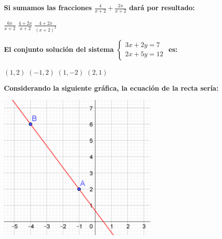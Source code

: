 \documentclass[11pt, addpoints, answers]{exam}
\begin{document}
\begin{questions}
		\question[1] \textbf{Si sumamos las fracciones $\frac{4}{x+2} + \frac{2x}{x+2}$ dará por resultado:}
		
		  
		
		\begin{choices} %
			\choice $\frac{6x}{x+2}$
			\choice $\frac{4+2x}{x+2}$
			\choice $\frac{4+2x}{(x+2)^2}$
		\end{choices}
		
		\vspace{1cm}

		
		\question[1] \textbf{El conjunto solución del sistema $\begin{cases} 3x+2y=7 \\ 2x+5y=12 \end{cases}$ es:}
		\begin{choices}
			\choice $(1, 2)$
			\choice $(-1, 2)$
			\choice $(1, -2)$
			\choice $(2, 1)$
		\end{choices}
		
		\question[1] \textbf{Considerando la siguiente gráfica, la ecuación de la recta sería:}
		\begin{center}
			\includegraphics[width=0.6\textwidth]{image_248acc.png}
		

\end{center}
\end{questions}
\end{document}
